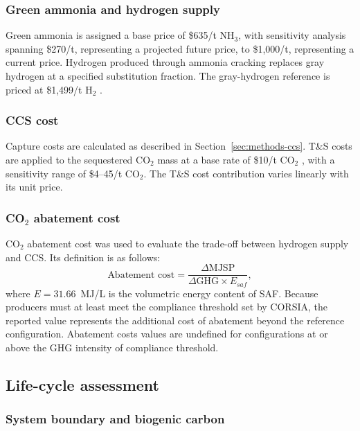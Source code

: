 \subsubsection{Green ammonia and hydrogen supply}\label{sec:methods-nh3}

Green ammonia is assigned a base price of \$635/t NH$_3$, with sensitivity analysis spanning \$270/t, representing a projected future price, to \$1,000/t, representing a current price. Hydrogen produced through ammonia cracking replaces gray hydrogen at a specified substitution fraction. The gray-hydrogen reference is priced at \$1,499/t H$_2$ \citep{katebah2022analysis}.

\subsubsection{CCS cost}\label{sec:methods-ccscost}

Capture costs are calculated as described in Section~\ref{sec:methods-ccs}. T\&S costs are applied to the sequestered CO$_2$ mass at a base rate of \$10/t CO$_2$ , with a sensitivity range of \$4--45/t CO$_2$. The T\&S cost contribution varies linearly with its unit price.

\subsubsection{CO$_2$ abatement cost}
CO$_2$ abatement cost was used to evaluate the trade-off between hydrogen supply and CCS. Its definition is as follows: 
    \begin{equation}
    \text{Abatement cost} =
    \frac{\Delta\mathrm{MJSP}}
    {\Delta\mathrm{GHG}\times E_{saf}},
    \end{equation}
where \(E=31.66\)~MJ/L is the volumetric energy content of SAF. Because producers must at least meet the compliance threshold set by CORSIA, the reported value represents the additional cost of abatement beyond the reference configuration. Abatement costs values are undefined for configurations at or above the GHG intensity of compliance threshold. 


\subsection{Life-cycle assessment}\label{sec:methods-lca}

\subsubsection{System boundary and biogenic carbon}\label{sec:methods-boundary}

